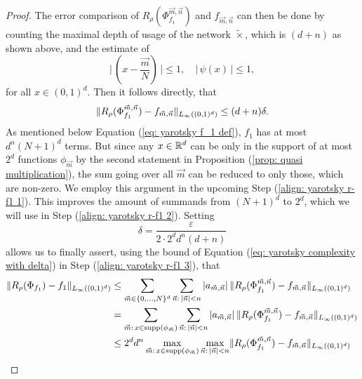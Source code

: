 \begin{proof}
    The error comparison of $R_\rho(\Phi^{\vec{m}, \vec{n}}_{f_1})$ and $f_{\vec{m}, \vec{n}}$ can then be done by counting the maximal depth of 
    usage of the network $\tilde{\times}$,
    which is $(d + n)$ as shown above, and the estimate of 
    \begin{equation*}
        \bigg\vert \, \left(x - \frac{\vec{m}}{N}\right) \, \bigg\vert \leq 1, \quad 
        \vert \, \psi(x) \, \vert \leq 1, 
    \end{equation*} 
    for all $x \in (0, 1)^d$. Then it follows directly, that
    \begin{equation*}
        \lVert R_\rho(\Phi_{f_1}^{\vec{m}, \vec{n}}) - f_{\vec{m},\vec{n}} \rVert_{L_\infty((0,1)^d)} \leq (d + n) \delta.
    \end{equation*}
    As mentioned below Equation (\ref{eq: yarotsky f_1 def}), $f_1$ has at most $d^n (N + 1)^d$
    terms. But since any $x \in \mathbb{R}^d$ can be only in the support of at most $2^d$ functions $\phi_{\vec{m}}$ by the
    second statement in Proposition (\ref{prop: quasi multiplication}), the
    sum going over all $\vec{m}$ can be reduced to only those, which are non-zero. We employ this argument in the 
    upcoming Step (\ref{align: yarotsky r-f1 1}). This improves the amount of summands from
    $(N+1)^d$ to $2^d$, which we will use in Step (\ref{align: yarotsky r-f1 2}). Setting
    \begin{equation*}
        \delta = \frac{\varepsilon}{2 \cdot 2^{d} d^n(d + n)}
    \end{equation*}
    allows us to finally assert, using the bound of Equation (\ref{eq: yarotsky complexity with delta})
    in Step (\ref{align: yarotsky r-f1 3}), that
    \begin{align}
        \inftynorm{R_\rho(\Phi_{f_1}) - f_1}
        &\leq \sum_{\vec{m} \in \{0, \dots, N\}^d} 
        \sum_{\vec{n}: \, \vert \vec{n} \vert < n} \vert a_{\vec{m}, \vec{n}}  \vert \,
        \inftynorm{R_\rho(\Phi_{f_1}^{\vec{m}, \vec{n}}) - f_{\vec{m}, \vec{n}}} \\
        &= \sum_{\vec{m}: \, x \in \operatorname{supp}(\phi_{\vec{m}})} 
        \sum_{\vec{n}: \, \vert \vec{n} \vert < n} \vert a_{\vec{m}, \vec{n}} \vert \,
        \inftynorm{R_\rho(\Phi_{f_1}^{\vec{m}, \vec{n}}) - f_{\vec{m}, \vec{n}}} \label{align: yarotsky r-f1 1}\\
        &\leq 2^d d^n \max\limits_{\vec{m}: \, x \in \operatorname{supp}(\phi_{\vec{m}})} \max\limits_{\vec{n}: \, \vert \vec{n} \vert < n}
        \inftynorm{R_\rho(\Phi_{f_1}^{\vec{m}, \vec{n}}) - f_{\vec{m}, \vec{n}}} \label{align: yarotsky r-f1 2}\\

\end{align}
\end{proof}
